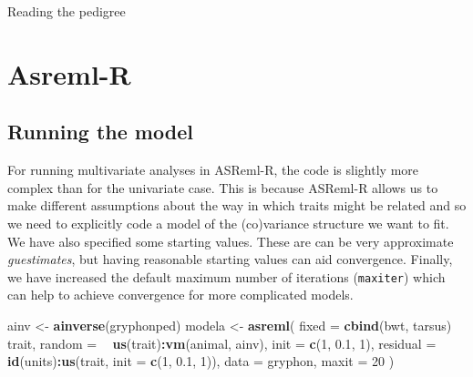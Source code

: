 \documentclass[12pt,]{book}
\newenvironment{Shaded}{\begin{snugshade}}{\end{snugshade}}
\newcommand{\DataTypeTok}[1]{\textcolor[rgb]{0.13,0.29,0.53}{#1}}
\newcommand{\DecValTok}[1]{\textcolor[rgb]{0.00,0.00,0.81}{#1}}
\newcommand{\FloatTok}[1]{\textcolor[rgb]{0.00,0.00,0.81}{#1}}
\newcommand{\KeywordTok}[1]{\textcolor[rgb]{0.13,0.29,0.53}{\textbf{#1}}}
\newcommand{\NormalTok}[1]{#1}
\newcommand{\OperatorTok}[1]{\textcolor[rgb]{0.81,0.36,0.00}{\textbf{#1}}}
\newcommand{\StringTok}[1]{\textcolor[rgb]{0.31,0.60,0.02}{#1}}
\begin{document}
Reading the pedigree

\begin{Shaded}
\end{Shaded}

\hypertarget{asreml-biv}{%
\section{Asreml-R}\label{asreml-biv}}

\hypertarget{running-the-model-2}{%
\subsection{Running the model}\label{running-the-model-2}}

For running multivariate analyses in ASReml-R, the code is slightly more complex than for the univariate case. This is because ASReml-R allows us to make different assumptions about the way in which traits might be related and so we need to explicitly code a model of the (co)variance structure we want to fit. We have also specified some starting values. These are can be very approximate \emph{guestimates}, but having reasonable starting values can aid convergence. Finally, we have increased the default maximum number of iterations (\texttt{maxiter}) which can help to achieve convergence for more complicated models.

\begin{Shaded}
\begin{Highlighting}[]
\NormalTok{ainv <-}\StringTok{ }\KeywordTok{ainverse}\NormalTok{(gryphonped)}
\NormalTok{modela <-}\StringTok{ }\KeywordTok{asreml}\NormalTok{(}
  \DataTypeTok{fixed =} \KeywordTok{cbind}\NormalTok{(bwt, tarsus) }\OperatorTok{~}\StringTok{ }\NormalTok{trait,}
  \DataTypeTok{random =} \OperatorTok{~}\StringTok{ }\KeywordTok{us}\NormalTok{(trait)}\OperatorTok{:}\KeywordTok{vm}\NormalTok{(animal, ainv), }\DataTypeTok{init =} \KeywordTok{c}\NormalTok{(}\DecValTok{1}\NormalTok{, }\FloatTok{0.1}\NormalTok{, }\DecValTok{1}\NormalTok{),}
  \DataTypeTok{residual =} \OperatorTok{~}\StringTok{ }\KeywordTok{id}\NormalTok{(units)}\OperatorTok{:}\KeywordTok{us}\NormalTok{(trait, }\DataTypeTok{init =} \KeywordTok{c}\NormalTok{(}\DecValTok{1}\NormalTok{, }\FloatTok{0.1}\NormalTok{, }\DecValTok{1}\NormalTok{)),}
  \DataTypeTok{data =}\NormalTok{ gryphon,}
  \DataTypeTok{maxit =} \DecValTok{20}
\NormalTok{)}
\end{Highlighting}
\end{Shaded}
\end{document}
